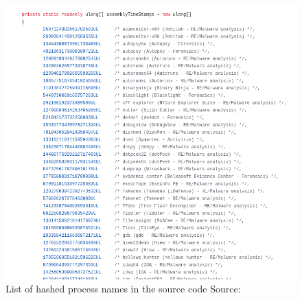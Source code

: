 \documentclass[
	letterpaper, %
	10pt, %
	unnumberedsections, %
	twoside, %
]{LTJournalArticle}
\begin{document}
\begin{appendices}
\begin{landscape}
\end{landscape}

\begin{figure}[p] %
	\includegraphics[width=\linewidth]{Figures/hashedProcessNames.png}
	\caption{List of hashed process names in the source code Source:\cite{SolarWindsOrionCoreBusinessLayerdll}}
	\label{fig:HashedProcesses}
\end{figure}

\end{appendices}
\end{document}
